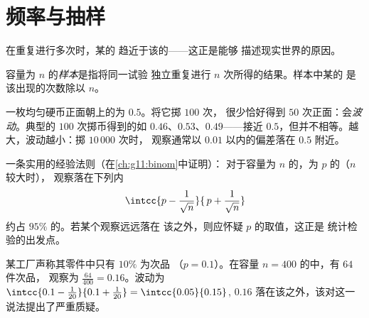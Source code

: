 \section{频率与抽样}

在重复进行多次时，某的
趋近于该的——这正是能够
描述现实世界的原因。

\begin{definition}[样本]\label{def:g10:proba:sample}
容量为 $n$ 的\emph{样本}是指将同一试验
独立重复进行 $n$ 次所得的结果。样本中某的\emph{}
是该出现的次数除以 $n$。
\end{definition}

\begin{example}\label{ex:g10:proba:sampling}
一枚均匀硬币正面朝上的为 $0.5$。将它掷 $100$ 次，
很少恰好得到 $50$ 次正面：会\emph{波动}。典型的
$100$ 次掷币得到的如 $0.46$、$0.53$、$0.49$——接近
$0.5$，但并不相等。越大，波动越小：掷 $10\,000$ 次时，
观察通常以 $0.01$ 以内的偏差落在 $0.5$ 附近。
\end{example}

\begin{remark}[波动区间]
一条实用的经验法则（在\cref{ch:g11:binom}中证明）：
对于容量为 $n$ 的，为 $p$ 的（$n$ 较大时），
观察落在下列内
\[
\intcc{p - \frac{1}{\sqrt n}}{\,p + \frac{1}{\sqrt n}}
\]
约占 $95\%$ 的。若某个观察远远落在
该之外，则应怀疑 $p$ 的取值，这正是
统计检验的出发点。
\end{remark}

\begin{example}\label{ex:g10:proba:test}
某工厂声称其零件中只有 $10\%$ 为次品
（$p = 0.1$）。在容量 $n = 400$ 的中，有 $64$ 件次品，
观察为 $\frac{64}{400} = 0.16$。波动为
$\intcc{0.1 - \frac{1}{20}}{0.1 + \frac{1}{20}} = \intcc{0.05}{0.15}$,
$0.16$ 落在该之外，该对这一说法提出了严重质疑。
\end{example}

